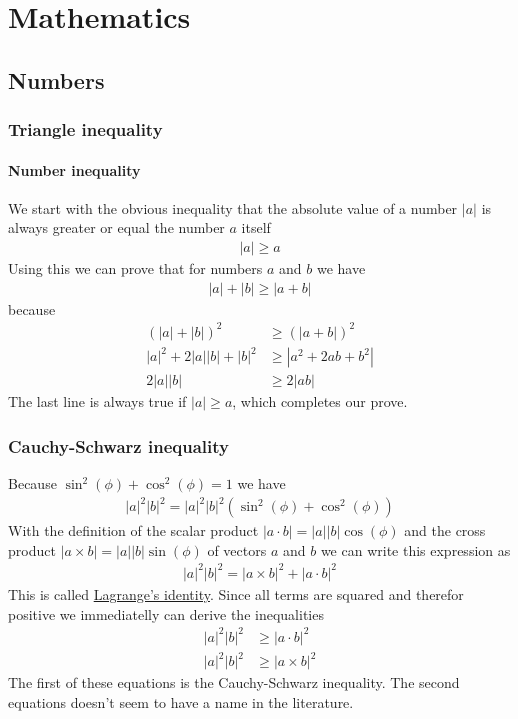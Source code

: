 \chapter{Mathematics}

\section{Numbers}

\subsection{Triangle inequality}

\subsubsection{Number inequality}

We start with the obvious inequality that the absolute value of a number
$\left|a\right|$ is always greater or equal the number $a$ itself 
\begin{align}
|a| \geq a
\end{align} 
Using this we can prove that for numbers $a$ and $b$ we have 
\begin{align}
|a| + |b|  \geq |a+b|
\end{align} 
because 
\begin{align}
(|a| + |b|)^2  &\geq (|a+b|)^2 \\
|a|^2  + 2|a||b| + |b|^2 &\geq |a^2 + 2ab + b^2| \\
2|a||b| &\geq 2|ab|
\end{align} 
The last line is always true if $|a| \geq a$, which completes our
prove. 

\subsection{Cauchy-Schwarz inequality} 
Because
$\sin^2(\phi) + \cos^2(\phi) = 1$ we have 
\begin{align}
|a|^2|b|^2 = |a|^2|b|^2 (\sin^2(\phi) + \cos^2(\phi))
\end{align} 
With the definition of the scalar product
$|a\cdot b| = |a||b|\cos(\phi)$ and the cross product
$|a\times b| = |a||b|\sin(\phi)$ of vectors $a$ and $b$ we can
write this expression as 
\begin{align}
|a|^2|b|^2 = |a\times b|^2 + |a\cdot b|^2
\end{align} 
This is called \href{https://en.wikipedia.org/wiki/Lagrange\%27s_identity}{Lagrange's identity}. Since all terms are squared and
therefor positive we immediatelly can derive the inequalities 
\begin{align}
|a|^2|b|^2 &\geq |a\cdot b|^2 \\
|a|^2|b|^2 &\geq |a\times b|^2
\end{align} 
The first of these equations is the Cauchy-Schwarz inequality. The
second equations doesn't seem to have a name in the literature.

